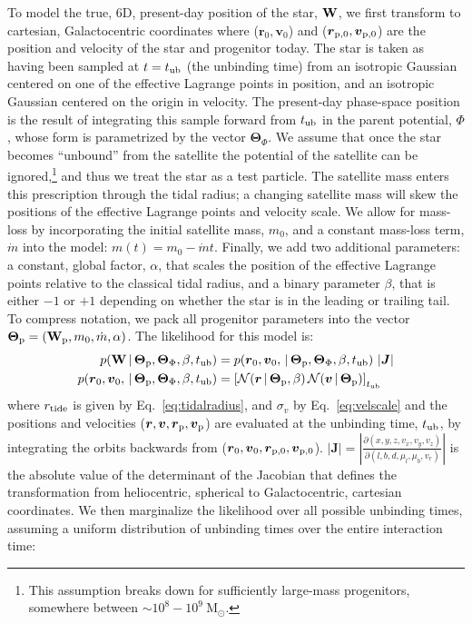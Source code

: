 \documentclass[letterpaper,12pt,preprint]{aastex}
\newcommand{\given}{\,|\,}
\newcommand{\msun}{\mathrm{M}_\odot}
\newcommand{\W}{{\bf W}}
\newcommand{\J}{{\boldsymbol J}}
\newcommand{\rtide}{r_{\rm tide}}
\newcommand{\bs}{\boldsymbol}
\newcommand{\sat}{{\rm p}}
\newcommand{\tub}{t_{\rm ub}}
\newcommand{\tailbit}{\beta}
\newcommand{\Loffset}{\alpha}
\begin{document}
To model the true, 6D, present-day position of the star, $\W$, we first transform to cartesian, Galactocentric coordinates where ($\bs{r}_0,\bs{v}_0$) and ($\bs{r}_{\sat,0},\bs{v}_{\sat,0}$) are the position and velocity of the star and progenitor today. The star is taken as having been sampled at $t=\tub$ (the unbinding time) from an isotropic Gaussian centered on one of the effective Lagrange points in position, and an isotropic Gaussian centered on the origin in velocity. The present-day phase-space position is the result of integrating this sample forward from $\tub$ in the parent potential, $\Phi$, whose form is parametrized by the vector $\bs{\Theta}_\Phi$. We assume that once the star becomes ``unbound'' from the satellite the potential of the satellite can be ignored,\footnote{This assumption breaks down for sufficiently large-mass progenitors, somewhere between $\sim10^8-10^9~\msun$.} and thus we treat the star as a test particle. The satellite mass enters this prescription through the tidal radius; a changing satellite mass will skew the positions of the effective Lagrange points and velocity scale. We allow for mass-loss by incorporating the initial satellite mass, $m_0$, and a constant mass-loss term, $\dot{m}$ into the model: $m(t) = m_0 - \dot{m}t$. Finally, we add two additional parameters: a constant, global factor, $\Loffset$, that scales the position of the effective Lagrange points relative to the classical tidal radius, and a binary parameter $\tailbit$, that is either $-1$ or $+1$ depending on whether the star is in the leading or trailing tail. To compress notation, we pack all progenitor parameters into the vector $\bs{\Theta}_\sat = (\W_\sat, m_0, \dot{m}, \Loffset)$. The likelihood for this model is:
\begin{align}
	p(\W \given \bs{\Theta}_\sat, \bs{\Theta}_\Phi, \tailbit, \tub) &= p(\bs{r}_0,\bs{v}_0, \given \bs{\Theta}_\sat, \bs{\Theta}_\Phi, \tailbit, \tub)\,\left\vert\J\right\vert\label{eq:starlike}\\
	p(\bs{r}_0,\bs{v}_0, \given \bs{\Theta}_\sat, \bs{\Theta}_\Phi,\tailbit,\tub) &= \left[\mathcal{N}(\bs{r} \given \bs{\Theta}_\sat, \tailbit)\,\mathcal{N}(\bs{v} \given \bs{\Theta}_\sat)\right]_{\tub}
\end{align}
where $\rtide$ is given by Eq.~\ref{eq:tidalradius}, and $\sigma_v$ by Eq.~\ref{eq:velscale} and the positions and velocities ($\bs{r},\bs{v}, \bs{r}_{\sat},\bs{v}_{\sat}$) are evaluated at the unbinding time, $\tub$, by integrating the orbits backwards from ($\bs{r}_0,\bs{v}_0, \bs{r}_{\sat,0},\bs{v}_{\sat,0}$). $\left\vert\J\right\vert = \left\vert\frac{\partial(x,y,z,v_x,v_y,v_z)}{\partial(l,b,d,\mu_l,\mu_b,v_r)}\right\vert$ is the absolute value of the determinant of the Jacobian that defines the transformation from heliocentric, spherical to Galactocentric, cartesian coordinates. We then marginalize the likelihood over all possible unbinding times, assuming a uniform distribution of unbinding times over the entire interaction time:
\end{document}
